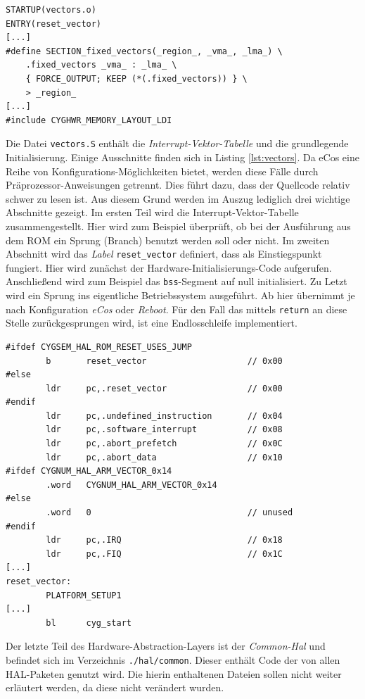 \documentclass[
  a4paper,					%
  twoside,
  DIV=calc,     				%
  bibliography=totoc,
  cleardoublepage=empty,
  ngerman,     					%
  final       					%
]{scrbook}
\begin{document}
\begin{lstlisting}[frame=single, float, caption={arm.ld}, label={lst:arm_ld}]
STARTUP(vectors.o)
ENTRY(reset_vector)
[...]
#define SECTION_fixed_vectors(_region_, _vma_, _lma_) \
    .fixed_vectors _vma_ : _lma_ \
    { FORCE_OUTPUT; KEEP (*(.fixed_vectors)) } \
    > _region_
[...]
#include CYGHWR_MEMORY_LAYOUT_LDI
\end{lstlisting}

Die Datei \texttt{vectors.S} enthält die \emph{Interrupt-Vektor-Tabelle} und die grundlegende Initialisierung. Einige Ausschnitte finden sich in Listing \ref{lst:vectors}. Da eCos eine Reihe von Konfigurations-Möglichkeiten bietet, werden diese Fälle durch Präprozessor-Anweisungen getrennt. Dies führt dazu, dass der Quellcode relativ schwer zu lesen ist. Aus diesem Grund werden im Auszug lediglich drei wichtige Abschnitte gezeigt. Im ersten Teil wird die Interrupt-Vektor-Tabelle zusammengestellt. Hier wird zum Beispiel überprüft, ob bei der Ausführung aus dem ROM ein Sprung (Branch) benutzt werden soll oder nicht. Im zweiten Abschnitt wird das \emph{Label} \texttt{reset\_vector} definiert, dass als Einstiegspunkt fungiert. Hier wird zunächst der Hardware-Initialisierungs-Code aufgerufen. Anschließend wird zum Beispiel das \texttt{bss}-Segment auf null initialisiert. Zu Letzt wird ein Sprung ins eigentliche Betriebssystem ausgeführt. Ab hier übernimmt je nach Konfiguration \emph{eCos} oder \emph{Reboot}. Für den Fall das mittels \texttt{return} an diese Stelle zurückgesprungen wird, ist eine Endlosschleife implementiert.

\begin{lstlisting}[frame=single, float, caption={vectors.S}, label={lst:vectors}]
#ifdef CYGSEM_HAL_ROM_RESET_USES_JUMP
        b       reset_vector                    // 0x00
#else        
        ldr     pc,.reset_vector                // 0x00
#endif        
        ldr     pc,.undefined_instruction       // 0x04
        ldr     pc,.software_interrupt          // 0x08
        ldr     pc,.abort_prefetch              // 0x0C
        ldr     pc,.abort_data                  // 0x10
#ifdef CYGNUM_HAL_ARM_VECTOR_0x14
        .word   CYGNUM_HAL_ARM_VECTOR_0x14
#else
        .word   0                               // unused
#endif
        ldr     pc,.IRQ                         // 0x18
        ldr     pc,.FIQ                         // 0x1C
[...]
reset_vector:
        PLATFORM_SETUP1 
[...]
        bl      cyg_start
\end{lstlisting}

Der letzte Teil des Hardware-Abstraction-Layers ist der \emph{Common-Hal} und befindet sich im Verzeichnis \texttt{./hal/common}. Dieser enthält Code der von allen HAL-Paketen genutzt wird. Die hierin enthaltenen Dateien sollen nicht weiter erläutert werden, da diese nicht verändert wurden.
\end{document}
